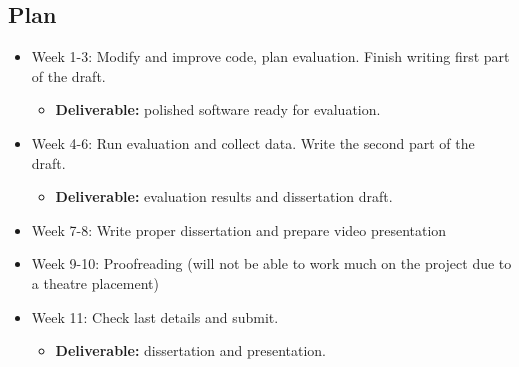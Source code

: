 \documentclass[11pt]{article}
\begin{document}
\subsection{Plan}\label{plan}
\begin{itemize}[parsep=0pt]
    \item Week 1-3: Modify and improve code, plan evaluation. Finish writing first part of the draft.
        \begin{itemize}
            \item \textbf{Deliverable:} polished software ready for evaluation.
        \end{itemize}
    \item Week 4-6: Run evaluation and collect data. Write the second part of the draft.
        \begin{itemize}
            \item \textbf{Deliverable:} evaluation results and dissertation draft.
        \end{itemize}
    \item Week 7-8: Write proper dissertation and prepare video presentation
    \item Week 9-10: Proofreading (will not be able to work much on the project due to a theatre placement)
    \item Week 11: Check last details and submit.
        \begin{itemize}
            \item \textbf{Deliverable:}  dissertation and presentation.
        \end{itemize}
\end{itemize}
\end{document}

